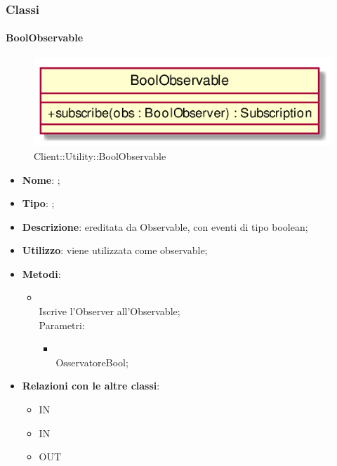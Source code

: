 \subsubsection{Classi}
\hypertarget{BoolObservable_label}{\paragraph{BoolObservable}}
\begin{figure}[h]
	\centering
	\includegraphics[width=\textwidth,height=\textheight,keepaspectratio]{images/ClassBoolObservable.png}
	\caption{Client::Utility::BoolObservable}
\end{figure}
\begin{itemize}
	\item \textbf{Nome}: ;
	\item \textbf{Tipo}: ;
	\item \textbf{Descrizione}: ereditata da Observable, con eventi di tipo boolean;
	\item \textbf{Utilizzo}: viene utilizzata come observable;
	\item \textbf{Metodi}:
	\begin{itemize}
		\item[]  \\
		Iscrive l'Observer all'Observable;\\
		Parametri:
		\begin{itemize}
			\item {} \\
			OsservatoreBool;
		\end{itemize}
	\end{itemize}
	\item \textbf{Relazioni con le altre classi}:
	\begin{itemize}
		\item IN \hyperlink{Player_label}{}
		\item IN \hyperlink{BoolObserver_label}{}
		\item OUT \hyperlink{BoolSubject_label}{}
	\end{itemize}
\end{itemize}
\FloatBarrier


